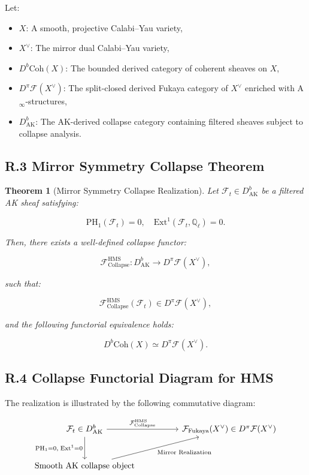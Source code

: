 \documentclass[11pt]{article}
\newtheorem{theorem}{Theorem}[section]
\begin{document}
Let:
\begin{itemize}
  \item $X$: A smooth, projective Calabi–Yau variety,
  \item $X^\vee$: The mirror dual Calabi–Yau variety,
  \item $D^b\mathrm{Coh}(X)$: The bounded derived category of coherent sheaves on $X$,
  \item $D^\pi\mathcal{F}(X^\vee)$: The split-closed derived Fukaya category of $X^\vee$ enriched with A$_\infty$-structures,
  \item $D^b_{\mathrm{AK}}$: The AK-derived collapse category containing filtered sheaves subject to collapse analysis.
\end{itemize}

\subsection*{R.3 Mirror Symmetry Collapse Theorem}

\begin{theorem}[Mirror Symmetry Collapse Realization]
Let $\mathcal{F}_t \in D^b_{\mathrm{AK}}$ be a filtered AK sheaf satisfying:

\[
\mathrm{PH}_1(\mathcal{F}_t) = 0, \quad \mathrm{Ext}^1(\mathcal{F}_t, \mathbb{Q}_\ell) = 0.
\]

Then, there exists a well-defined collapse functor:

\[
\mathcal{F}_{\mathrm{Collapse}}^{\mathrm{HMS}} : D^b_{\mathrm{AK}} \longrightarrow D^\pi\mathcal{F}(X^\vee),
\]

such that:

\[
\mathcal{F}_{\mathrm{Collapse}}^{\mathrm{HMS}}(\mathcal{F}_t) \in D^\pi\mathcal{F}(X^\vee),
\]

and the following functorial equivalence holds:

\[
D^b\mathrm{Coh}(X) \simeq D^\pi\mathcal{F}(X^\vee).
\]
\end{theorem}

\subsection*{R.4 Collapse Functorial Diagram for HMS}

The realization is illustrated by the following commutative diagram:

\[
\begin{tikzcd}[column sep=huge, row sep=large]
\mathcal{F}_t \in D^b_{\mathrm{AK}} \arrow[r, "{\mathcal{F}_{\mathrm{Collapse}}^{\mathrm{HMS}}}"] \arrow[d, swap, "{\mathrm{PH}_1 = 0,\; \mathrm{Ext}^1 = 0}"]
& \mathcal{F}_{\mathrm{Fukaya}}(X^\vee) \in D^\pi\mathcal{F}(X^\vee) \\
\text{Smooth AK collapse object} \arrow[ru, swap, "{\text{Mirror Realization}}"] &
\end{tikzcd}
\]
\end{document}

